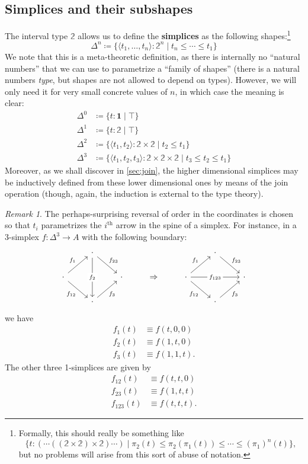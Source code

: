 \documentclass{amsart}
\theoremstyle{plain}
\theoremstyle{definition}
\theoremstyle{remark}
\newtheorem{rmk}[thm]{Remark}
\numberwithin{equation}{section}
\newcommand{\jdeq}{\equiv}
\newcommand{\defeq}{\coloneqq}
\newcommand{\unittype}{\ensuremath{\mathbf{1}}}
\newcommand{\sh}[2]{\{#1\mid #2\}}
\newcommand{\pair}[1]{\langle #1\rangle}
\newcommand{\two}{\mathbb{2}}
\begin{document}
\subsection{Simplices and their subshapes}
\label{sec:sub-simplices}

The interval type $\two$ allows us to define the \textbf{simplices} as the following shapes:\footnote{Formally, this should really be something like \[\sh{t:(\cdots((\two\times \two)\times \two)\cdots)}{\pi_2(t) \le \pi_2(\pi_1(t)) \le \cdots \le (\pi_1)^n(t)},\] but no problems will arise from this sort of abuse of notation.}
\[ \Delta^n \defeq \sh{\pair{t_1,\dots,t_n}:\two^n}{t_n\le\cdots\le t_1} \]
We note that this is a meta-theoretic definition, as there is internally no ``natural numbers'' that we can use to parametrize a ``family of shapes'' (there is a natural numbers \emph{type}, but shapes are not allowed to depend on types).
However, we will only need it for very small concrete values of $n$, in which case the meaning is clear:
\begin{align*}
  \Delta^0 &\defeq \sh{t:\unittype}{\top}\\
  \Delta^1 &\defeq \sh{t:\two}{\top}\\
  \Delta^2 &\defeq \sh{\pair{t_1,t_2}:\two\times\two}{t_2\le t_1}\\
  \Delta^3 &\defeq \sh{\pair{t_1,t_2,t_3}:\two\times\two\times\two}{t_3\le t_2 \le t_1}
\end{align*}
Moreover, as we shall discover in \cref{sec:join}, the higher dimensional simplices may be inductively defined from these lower dimensional ones by means of the join operation (though, again, the induction is external to the type theory).

\begin{rmk}
  The perhaps-surprising reversal of order in the coordinates is chosen so that $t_i$ parametrizes the $i^{\mathrm{th}}$ arrow in the spine of a simplex.
  For instance, in a 3-simplex $f:\Delta^3 \to A$ with the following boundary:
  \[
  \begin{tikzcd}
    & \cdot\ar[dr,"f_{23}"] \ar[dd,"f_2" description] &&&& \cdot \ar[dr,"f_{23}"]\\
    \cdot\ar[ur,"f_{1}"] \ar[dr,"f_{12}"'] && \cdot & \Rightarrow & \cdot\ar[ur,"f_{1}"] \ar[dr,"f_{12}"'] \ar[rr,"f_{123}" description] && \cdot\\
    & \cdot\ar[ur,"f_3"'] &&&& \cdot\ar[ur,"f_3"']
  \end{tikzcd}
  \]
  we have
  \begin{align*}
    f_1(t) &\jdeq f(t,0,0)\\
    f_2(t) &\jdeq f(1,t,0)\\
    f_3(t) &\jdeq f(1,1,t).
  \end{align*}
  The other three 1-simplices are given by
  \begin{align*}
    f_{12}(t) &\jdeq f(t,t,0)\\
    f_{23}(t) &\jdeq f(1,t,t)\\
    f_{123}(t) &\jdeq f(t,t,t).
  \end{align*}
\end{rmk}
\end{document}
